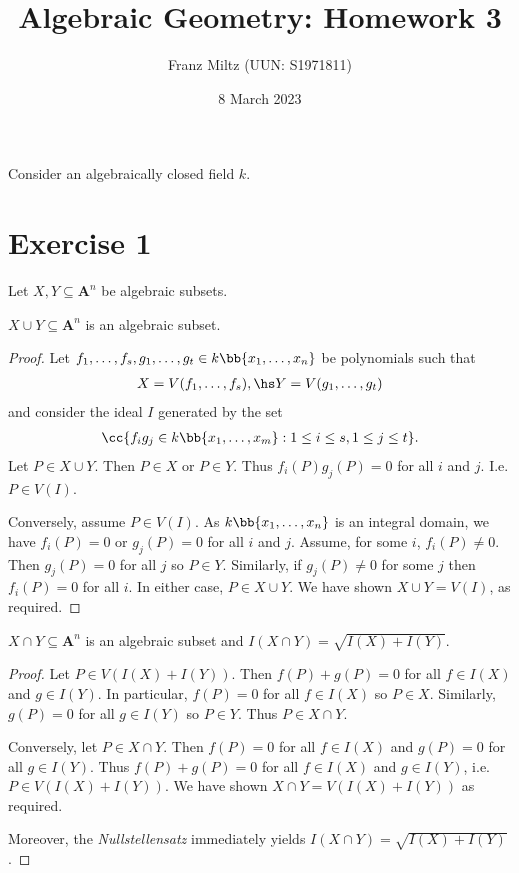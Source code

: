 \documentclass{article}
\begin{document}
\title{Algebraic Geometry: Homework 3}
\author{Franz Miltz (UUN: S1971811)}
\date{8 March 2023}
\maketitle

Consider an algebraically closed field $k$.

\section*{Exercise 1}

Let $X,Y\subseteq\mathbf A^n$ be algebraic subsets.

\begin{claim*}[1]
  $X\cup Y\subseteq \mathbf A^n$ is an algebraic subset.
  \begin{proof}
    Let $f_1,\ldots,f_s,g_1,\ldots,g_t\in k\bb{x_1,\ldots,x_n}$ be polynomials such that
    \begin{align*}
      X=V(f_1,\ldots,f_s), \hs
      Y=V(g_1,\ldots,g_t)
    \end{align*}
    and consider the ideal $I$ generated by the set
    \begin{align*}
      \cc{f_i g_j \in k\bb{x_1,\ldots,x_m} : 1\leq i\leq s, 1\leq j\leq t}.
    \end{align*}
    Let $P\in X\cup Y$. Then $P\in X$ or $P\in Y$. Thus $f_i(P)g_j(P)=0$ for all
    $i$ and $j$. I.e. $P\in V(I)$.

    Conversely, assume $P\in V(I)$. As $k\bb{x_1,\ldots,x_n}$ is an integral domain,
    we have $f_i(P)=0$ or $g_j(P)=0$ for all $i$ and $j$. Assume, for some $i$,
    $f_i(P)\neq 0$. Then $g_j(P)=0$ for all $j$ so $P\in Y$. Similarly, if $g_j(P)\neq 0$
    for some $j$ then $f_i(P)=0$ for all $i$. In either case, $P\in X\cup Y$. We
    have shown $X\cup Y=V(I)$, as required.
  \end{proof}
\end{claim*}

\begin{claim*}[2]
  $X\cap Y\subseteq\mathbf A^n$ is an algebraic subset and
  $I(X\cap Y)=\sqrt{I(X)+I(Y)}$.
  \begin{proof}
    Let $P\in V(I(X)+I(Y))$. Then $f(P)+g(P)=0$ for all $f\in I(X)$ and $g\in I(Y)$.
    In particular, $f(P)=0$ for all $f\in I(X)$ so $P\in X$. Similarly, $g(P)=0$ for
    all $g\in I(Y)$ so $P\in Y$. Thus $P\in X\cap Y$.

    Conversely, let $P\in X\cap Y$. Then $f(P)=0$ for all $f\in I(X)$ and
    $g(P)=0$ for all $g\in I(Y)$. Thus $f(P)+g(P)=0$ for all $f\in I(X)$ and
    $g\in I(Y)$, i.e. $P\in V(I(X)+I(Y))$. We have shown $X\cap Y=V(I(X)+I(Y))$
    as required.

    Moreover, the \emph{Nullstellensatz} immediately yields $I(X\cap Y)=\sqrt{I(X) + I(Y)}$.
  \end{proof}
\end{claim*}
\end{document}
